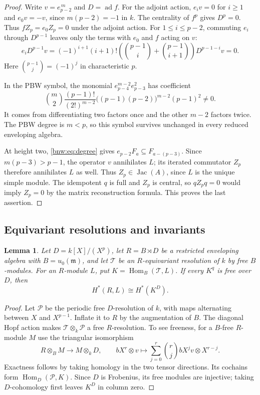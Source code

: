\documentclass[11pt,reqno]{amsart}
\newtheorem{lemma}[lemma]{Lemma}
\theoremstyle{definition}
\theoremstyle{remark}
\theoremstyle{definition}
\newcommand{\Jac}{\operatorname{Jac}}
\newcommand{\Hom}{\operatorname{Hom}}
\newcommand{\ad}{\operatorname{ad}}
\begin{document}
\begin{proof}
Write $v=e_{p-2}^{\,m}$ and $D=\ad f$.
For the adjoint action, $e_iv=0$ for $i\ge1$ and $e_0v=-v$,
since $m(p-2)=-1$ in $k$. The centrality of $f^p$ gives $D^p=0$.
Thus $fZ_p=e_0Z_p=0$ under the adjoint action.
For $1\le i\le p-2$, commuting $e_i$ through $D^{p-1}$ leaves
only the terms with $e_0$ and $f$ acting on $v$:
\[
 e_iD^{p-1}v
 =(-1)^{i+1}(i+1)!
 \left(\binom{p-1}{i}+\binom{p-1}{i+1}\right)D^{p-1-i}v=0.
\]
Here $\binom{p-1}{j}=(-1)^j$ in characteristic $p$.

In the PBW symbol, the monomial
$e_{p-4}^{m-2}e_{p-3}^2$ has coefficient
\[
 \binom m2\frac{(p-1)!}{(2!)^{m-2}}
 \bigl((p-1)(p-2)\bigr)^{m-2}(p-1)^2\ne0.
\]
It comes from differentiating two factors once and the other $m-2$
factors twice. The PBW degree is $m<p$, so this symbol survives
unchanged in every reduced enveloping algebra.

At height two, \eqref{bnw:eq:degree} gives
$e_{p-2}F_a\subseteq F_{a-(p-3)}$.
Since $m(p-3)>p-1$, the operator $v$ annihilates $L$;
its iterated commutator $Z_p$ therefore annihilates $L$ as well.
Thus $Z_p\in\Jac(A)$, since $L$ is the unique simple module.
The idempotent $q$ is full and $Z_p$ is central, so $qZ_pq=0$
would imply $Z_p=0$ by the matrix reconstruction formula.
This proves the last assertion.
\end{proof}

\subsection{Equivariant resolutions and invariants}

\begin{lemma}\label{lem:tate-invariants}
Let $D=k[X]/(X^p)$, let $R=B\rtimes D$ be a restricted enveloping
algebra with $B=u_0(\mathfrak m)$, and let $\mathcal T$ be an
$R$-equivariant resolution of $k$ by free $B$-modules.
For an $R$-module $L$, put $K=\Hom_B(\mathcal T,L)$.
If every $K^q$ is free over $D$, then
\[
 H^*(R,L)\cong H^*(K^D).
\]
\end{lemma}

\begin{proof}
Let $\mathcal P$ be the periodic free $D$-resolution of $k$,
with maps alternating between $X$ and $X^{p-1}$.
Inflate it to $R$ by the augmentation of $B$.
The diagonal Hopf action makes $\mathcal T\otimes_k\mathcal P$
a free $R$-resolution. To see freeness, for a $B$-free $R$-module $M$
use the triangular isomorphism
\[
 R\otimes_B M\longrightarrow M\otimes_k D,\qquad
 bX^r\otimes v\longmapsto
 \sum_{j=0}^r\binom rj bX^jv\otimes X^{r-j}.
\]
Exactness follows by taking homology in the two tensor directions.
Its cochains form $\Hom_D(\mathcal P,K)$.
Since $D$ is Frobenius, its free modules are injective;
taking $D$-cohomology first leaves $K^D$ in column zero.
\end{proof}
\end{document}
